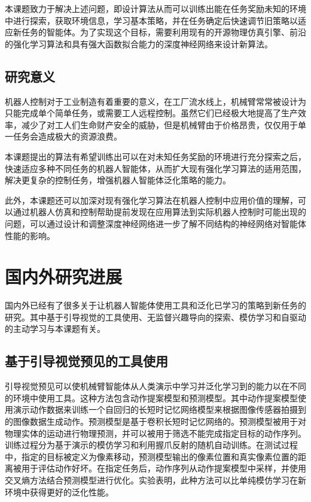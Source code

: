         本课题致力于解决上述问题，即设计算法从而可以训练出能在任务奖励未知的环境中进行探索，获取环境信息，学习基本策略，并在任务确定后快速调节旧策略以适应新任务的智能体。为了实现这个目标，需要利用现有的开源物理仿真引擎、前沿的强化学习算法和具有强大函数拟合能力的深度神经网络来设计新算法。
        
        \subsection{研究意义}

        机器人控制对于工业制造有着重要的意义，在工厂流水线上，机械臂常常被设计为只能完成单个简单任务，或需要工人远程控制。虽然它们已经极大地提高了生产效率，减少了对工人们生命财产安全的威胁，但是机械臂由于价格昂贵，仅仅用于单一任务会造成极大的资源浪费。

        本课题提出的算法有希望训练出可以在对未知任务奖励的环境进行充分探索之后，快速适应多种不同任务的机器人智能体，从而扩大现有强化学习算法的适用范围，解决更复杂的控制任务，增强机器人智能体泛化策略的能力。

        此外，本课题还可以加深对现有强化学习算法在机器人控制中应用价值的理解，可以通过机器人仿真和控制帮助提前发现在应用算法到实际机器人控制时可能出现的问题，可以通过设计和调整深度神经网络进一步了解不同结构的神经网络对智能体性能的影响。
    
    \section{国内外研究进展}

    国内外已经有了很多关于让机器人智能体使用工具和泛化已学习的策略到新任务的研究。其中基于引导视觉的工具使用、无监督兴趣导向的探索、模仿学习和自驱动的主动学习与本课题有关。
        \subsection{基于引导视觉预见的工具使用}
        引导视觉预见\cite{xie2019improvisation}可以使机械臂智能体从人类演示中学习并泛化学习到的能力以在不同的环境中使用工具。这种方法包含动作提案模型和预测模型。其中动作提案模型使用演示动作数据来训练一个自回归的长短时记忆网络模型来根据图像传感器拍摄到的图像数据生成动作。预测模型是基于卷积长短时记忆网络的\cite{shi2015convolutional}。预测模型被用于对物理实体的运动进行物理预测，并可以被用于筛选不能完成指定目标的动作序列。训练过程分为基于演示的模仿学习和利用握爪反射的随机自动训练。在测试过程中，指定的目标被定义为像素移动，预测模型输出的像素位置和真实像素位置的距离被用于评估动作好坏。在指定任务后，动作序列从动作提案模型中采样，并使用交叉熵方法结合预测模型进行优化。实验表明，此种方法可以比单纯模仿学习在新环境中获得更好的泛化性能。

